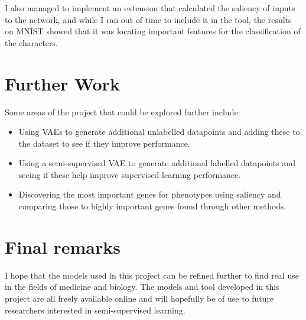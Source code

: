 I also managed to implement an extension that calculated the saliency of inputs to the network, and while I ran out of time to include it 
in the tool, the results on MNIST showed that it was locating important features for the classification of the characters.

\section{Further Work}

Some areas of the project that could be explored further include:
\begin{itemize}
    \item Using VAEs to generate additional unlabelled datapoints and adding these to the dataset to see if they improve performance.
    \item Using a semi-supervised VAE to generate additional labelled datapoints and seeing if these help improve supervised learning 
          performance.
    \item Discovering the most important genes for phenotypes using saliency and comparing those to highly important genes found through
          other methods.  
\end{itemize}

\section{Final remarks}

I hope that the models used in this project can be refined further to find real use in the fields of medicine and biology. The models and tool
developed in this project are all freely available online and will hopefully be of use to future researchers interested in semi-supervised
learning.